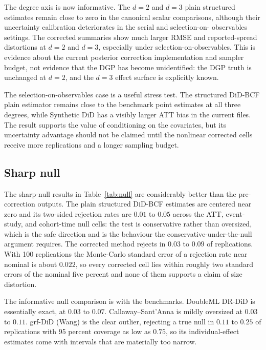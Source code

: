 \documentclass[11pt]{article}
\begin{document}
The degree axis is now informative. The $d=2$ and $d=3$ plain structured
estimates remain close to zero in the canonical scalar comparisons, although
their uncertainty calibration deteriorates in the serial and selection-on-
observables settings. The corrected summaries show much larger RMSE and
reported-spread distortions at $d=2$ and $d=3$, especially under
selection-on-observables. This is evidence about the current posterior
correction implementation and sampler budget, not evidence that the DGP has
become unidentified: the DGP truth is unchanged at $d=2$, and the $d=3$
effect surface is explicitly known.

The selection-on-observables case is a useful stress test. The structured
DiD-BCF plain estimator remains close to the benchmark point estimates at all
three degrees, while Synthetic DiD has a visibly larger ATT bias in the
current files. The result supports the value of conditioning on the
covariates, but its uncertainty advantage should not be claimed until the
nonlinear corrected cells receive more replications and a longer sampling
budget.





\subsection{Sharp null}

The sharp-null results in Table~\ref{tab:null} are considerably better than
the pre-correction outputs. The plain structured DiD-BCF estimates are centered
near zero and its two-sided rejection rates are $0.01$ to $0.05$ across the
ATT, event-study, and cohort-time null cells: the test is conservative rather
than oversized, which is the safe direction and is the behaviour the
conservative-under-the-null argument requires. The corrected method rejects in
$0.03$ to $0.09$ of replications. With 100 replications the Monte-Carlo
standard error of a rejection rate near nominal is about $0.022$, so every
corrected cell lies within roughly two standard errors of the nominal five
percent and none of them supports a claim of size distortion.

The informative null comparison is with the benchmarks. DoubleML DR-DiD is
essentially exact, at $0.03$ to $0.07$. Callaway--Sant'Anna is mildly oversized
at $0.03$ to $0.11$. grf-DiD (Wang) is the clear outlier, rejecting a true null
in $0.11$ to $0.25$ of replications with 95 percent coverage as low as $0.75$,
so its individual-effect estimates come with intervals that are materially
too narrow.
\end{document}
